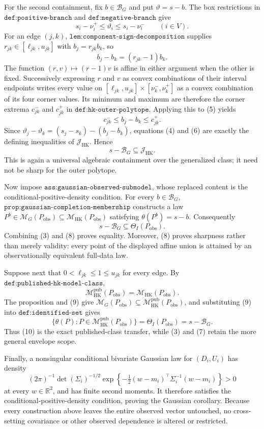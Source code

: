 For the second containment, fix \(b\in\mathcal B_G\) and put \(\vartheta=s-b\).  The box restrictions in \(\texttt{def:positive-branch}\) and \(\texttt{def:negative-branch}\) give
\[
s_i-\nu_i^+\le \vartheta_i\le s_i-\nu_i^-\qquad(i\in V). \tag{4}
\]
For an edge \((j,k)\), \(\texttt{lem:component-sign-decomposition}\) supplies \(r_{jk}\in[\ell_{jk},u_{jk}]\) with \(b_j=r_{jk}b_k\), so
\[
b_j-b_k=(r_{jk}-1)b_k. \tag{5}
\]
The function \((r,v)\mapsto(r-1)v\) is affine in either argument when the other is fixed.  Successively expressing \(r\) and \(v\) as convex combinations of their interval endpoints writes every value on \([\ell_{jk},u_{jk}]\times[\nu_k^-,\nu_k^+]\) as a convex combination of its four corner values.  Its minimum and maximum are therefore the corner extrema \(c_{jk}^-\) and \(c_{jk}^+\) in \(\texttt{def:hk-outer-polytope}\).  Applying this to (5) yields
\[
c_{jk}^-\le b_j-b_k\le c_{jk}^+. \tag{6}
\]
Since \(\vartheta_j-\vartheta_k=(s_j-s_k)-(b_j-b_k)\), equations (4) and (6) are exactly the defining inequalities of \(\mathcal J_{\mathrm{HK}}\).  Hence
\[
s-\mathcal B_G\subseteq\mathcal J_{\mathrm{HK}}. \tag{7}
\]
This is again a universal algebraic containment over the generalized class; it need not be sharp for the outer polytope.

Now impose \(\texttt{ass:gaussian-observed-submodel}\), whose replaced content is the conditional-positive-density condition.  For every \(b\in\mathcal B_G\), \(\texttt{prop:gaussian-completion-membership}\) constructs a law \(P^b\in\mathcal M_G(P_{\mathrm{obs}})\subseteq\mathcal M_{\mathrm{HK}}(P_{\mathrm{obs}})\) satisfying \(\theta(P^b)=s-b\).  Consequently
\[
s-\mathcal B_G\subseteq\Theta_I(P_{\mathrm{obs}}). \tag{8}
\]
Combining (3) and (8) proves equality.  Moreover, (8) proves sharpness rather than merely validity: every point of the displayed affine union is attained by an observationally equivalent full-data law.

Suppose next that \(0<\ell_{jk}\le1\le u_{jk}\) for every edge.  By \(\texttt{def:published-hk-model-class}\),
\[
\mathcal M_{\mathrm{HK}}^{\mathrm{pub}}(P_{\mathrm{obs}})
=\mathcal M_{\mathrm{HK}}(P_{\mathrm{obs}}). \tag{9}
\]
The proposition and (9) give \(\mathcal M_G(P_{\mathrm{obs}})\subseteq\mathcal M_{\mathrm{HK}}^{\mathrm{pub}}(P_{\mathrm{obs}})\), and substituting (9) into \(\texttt{def:identified-set}\) gives
\[
\{\theta(P):P\in\mathcal M_{\mathrm{HK}}^{\mathrm{pub}}(P_{\mathrm{obs}})\}
=\Theta_I(P_{\mathrm{obs}})=s-\mathcal B_G. \tag{10}
\]
Thus (10) is the exact published-class transfer, while (3) and (7) retain the more general envelope scope.

Finally, a nonsingular conditional bivariate Gaussian law for \((D_i,U_i)\) has density
\[
(2\pi)^{-1}\det(\Sigma_i)^{-1/2}
\exp\!\left\{-\tfrac12(w-m_i)^\top\Sigma_i^{-1}(w-m_i)\right\}>0
\]
at every \(w\in\mathbb R^2\), and has finite second moments.  It therefore satisfies the conditional-positive-density condition, proving the Gaussian corollary.  Because every construction above leaves the entire observed vector untouched, no cross-setting covariance or other observed dependence is altered or restricted.
